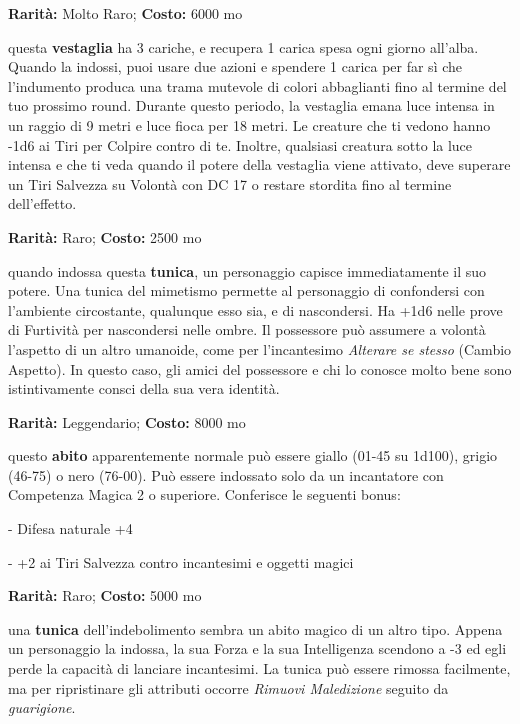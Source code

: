 \begin{multicols}{2}
\medskip


\textbf{Rarità:} Molto Raro; \textbf{Costo:} 6000 mo

questa \textbf{vestaglia} ha 3 cariche, e recupera 1 carica spesa ogni giorno all'alba. Quando la indossi, puoi usare due azioni e spendere 1 carica per far sì che l'indumento produca una trama mutevole di colori abbaglianti fino al termine del tuo prossimo round. Durante questo periodo, la vestaglia emana luce intensa in un raggio di 9 metri e luce fioca per 18 metri. Le creature che ti vedono hanno -1d6 ai Tiri per Colpire contro di te. Inoltre, qualsiasi creatura sotto la luce intensa e che ti veda quando il potere della vestaglia viene attivato, deve superare un Tiri Salvezza su Volontà con DC 17 o restare stordita fino al termine dell'effetto.


\textbf{Rarità:} Raro; \textbf{Costo:} 2500 mo

quando indossa questa \textbf{tunica}, un personaggio capisce immediatamente il suo potere. Una tunica del mimetismo permette al personaggio di confondersi con l'ambiente circostante, qualunque esso sia, e di nascondersi. Ha +1d6 nelle prove di Furtività per nascondersi nelle ombre. Il possessore può assumere a volontà l'aspetto di un altro umanoide, come per l'incantesimo \emph{Alterare se stesso} (Cambio Aspetto). In questo caso, gli amici del possessore e chi lo conosce molto bene sono istintivamente consci della sua vera identità.


\textbf{Rarità:} Leggendario; \textbf{Costo:} 8000 mo

questo \textbf{abito} apparentemente normale può essere giallo (01-45 su 1d100), grigio (46-75) o nero (76-00). Può essere indossato solo da un incantatore con Competenza Magica 2 o superiore. Conferisce le seguenti bonus:

- Difesa naturale +4

- +2 ai Tiri Salvezza contro incantesimi e oggetti magici


\textbf{Rarità:} Raro; \textbf{Costo:} 5000 mo

una \textbf{tunica} dell'indebolimento sembra un abito magico di un altro tipo. Appena un personaggio la indossa, la sua Forza e la sua Intelligenza scendono a -3 ed egli perde la capacità di lanciare incantesimi. La tunica può essere rimossa facilmente, ma per ripristinare gli attributi occorre \emph{Rimuovi Maledizione} seguito da \emph{guarigione}.


\end{multicols}
